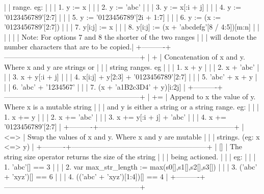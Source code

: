 |          | range. eg:                                              |
|          | 1. y := x                                               |
|          | 2. y := 'abc'                                           |
|          | 3. y := x[:i + j]                                       |
|          | 4. y := '0123456789'[2:7]                               |
|          | 5. y := '0123456789'[2i + 1:7]                          |
|          | 6. y := (x := '0123456789'[2:7])                        |
|          | 7. y[i:j] := x                                          |
|          | 8. y[i:j] := (x + 'abcdefg'[8 / 4:5])[m:n]              |
|          |                                                         |
|          | Note: For options 7 and 8 the shorter of the two ranges |
|          | will denote the number characters that are to be copied.|
+----------+---------------------------------------------------------+
|  +       | Concatenation of x and y. Where x and y are strings or  |
|          | string ranges. eg                                       |
|          | 1. x + y                                                |
|          | 2. x + 'abc'                                            |
|          | 3. x + y[:i + j]                                        |
|          | 4. x[i:j] + y[2:3] + '0123456789'[2:7]                  |
|          | 5. 'abc' + x + y                                        |
|          | 6. 'abc' + '1234567'                                    |
|          | 7. (x + 'a1B2c3D4' + y)[i:2j]                           |
+----------+---------------------------------------------------------+
|  +=      | Append to x the value of y. Where x is a mutable string |
|          | and y is either a string or a string range. eg:         |
|          | 1. x += y                                               |
|          | 2. x += 'abc'                                           |
|          | 3. x += y[:i + j] + 'abc'                               |
|          | 4. x += '0123456789'[2:7]                               |
+----------+---------------------------------------------------------+
| <=>      | Swap the values of x and y. Where x and y are mutable   |
|          | strings.  (eg: x <=> y)                                 |
+----------+---------------------------------------------------------+
| []       | The string size operator returns the size of the string |
|          | being actioned.                                         |
|          | eg:                                                     |
|          | 1. 'abc'[] == 3                                         |
|          | 2. var max\_str\_length := max(s0[],s1[],s2[],s3[])       |
|          | 3. ('abc' + 'xyz')[] == 6                               |
|          | 4. (('abc' + 'xyz')[1:4])[] == 4                        |
+----------+---------------------------------------------------------+

